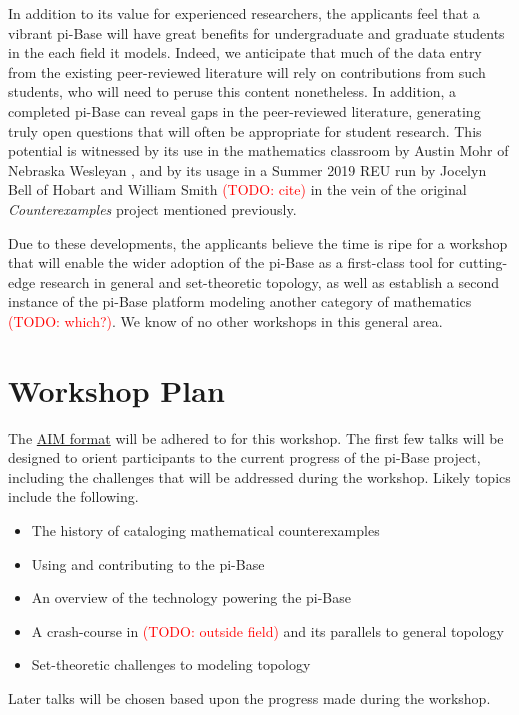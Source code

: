 \documentclass{amsart}
\newcommand{\TODO}[1]{\textcolor{red}{(TODO: #1)}}
\begin{document}
In addition to its value for experienced researchers, the applicants
feel that a vibrant pi-Base will have great benefits for 
undergraduate and graduate students in the each field it models.
Indeed, we anticipate that much of the
data entry from the existing peer-reviewed literature
will rely on contributions from such students, who will need to
peruse this content nonetheless. In addition, a completed pi-Base
can reveal gaps in the peer-reviewed literature, generating truly
open questions that will often be appropriate for student research.
This potential is witnessed by its use in the mathematics classroom
by Austin Mohr of Nebraska Wesleyan \cite{mohrPiBase}, 
and by its usage in a Summer 2019 REU run by Jocelyn Bell of
Hobart and William Smith \TODO{cite} in the vein of the original
\textit{Counterexamples} project mentioned previously.

Due to these developments, the applicants believe the time is ripe
for a workshop that will enable the wider adoption of the
pi-Base as a first-class tool for cutting-edge research in
general and set-theoretic topology, as well as establish
a second instance of the pi-Base platform
modeling another category of mathematics
\TODO{which?}. We know of no other workshops in this general area.

\section{Workshop Plan}

The \href{https://www.aimath.org/research/aimstyle.html}{AIM format}
will be adhered to for this workshop. The first few talks will be
designed to orient participants to the current progress of the pi-Base
project, including the challenges that will be addressed during the workshop.
Likely topics include the following.

\begin{itemize}
    \item The history of cataloging mathematical counterexamples 
    \item Using and contributing to the pi-Base 
    \item An overview of the technology powering the pi-Base
    \item A crash-course in \TODO{outside field} and its parallels to
      general topology
    \item Set-theoretic challenges to modeling topology
\end{itemize}

\noindent Later talks will be chosen based upon the progress made during the
workshop.
\end{document}
